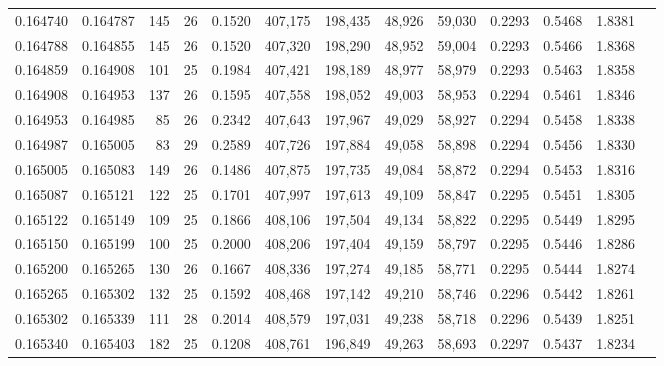 \begin{tabular}{rrrrrrrrrrrrr}
0.164740 & 0.164787 & 145 &  26 &                                     0.1520 & 407,175 & 198,435 &  48,926 &  59,030 & 0.2293 & 0.5468 & 1.8381 \\
0.164788 & 0.164855 & 145 &  26 &                                     0.1520 & 407,320 & 198,290 &  48,952 &  59,004 & 0.2293 & 0.5466 & 1.8368 \\
0.164859 & 0.164908 & 101 &  25 &                                     0.1984 & 407,421 & 198,189 &  48,977 &  58,979 & 0.2293 & 0.5463 & 1.8358 \\
0.164908 & 0.164953 & 137 &  26 &                                     0.1595 & 407,558 & 198,052 &  49,003 &  58,953 & 0.2294 & 0.5461 & 1.8346 \\
0.164953 & 0.164985 &  85 &  26 &                                     0.2342 & 407,643 & 197,967 &  49,029 &  58,927 & 0.2294 & 0.5458 & 1.8338 \\
0.164987 & 0.165005 &  83 &  29 &                                     0.2589 & 407,726 & 197,884 &  49,058 &  58,898 & 0.2294 & 0.5456 & 1.8330 \\
0.165005 & 0.165083 & 149 &  26 &                                     0.1486 & 407,875 & 197,735 &  49,084 &  58,872 & 0.2294 & 0.5453 & 1.8316 \\
0.165087 & 0.165121 & 122 &  25 &                                     0.1701 & 407,997 & 197,613 &  49,109 &  58,847 & 0.2295 & 0.5451 & 1.8305 \\
0.165122 & 0.165149 & 109 &  25 &                                     0.1866 & 408,106 & 197,504 &  49,134 &  58,822 & 0.2295 & 0.5449 & 1.8295 \\
0.165150 & 0.165199 & 100 &  25 &                                     0.2000 & 408,206 & 197,404 &  49,159 &  58,797 & 0.2295 & 0.5446 & 1.8286 \\
0.165200 & 0.165265 & 130 &  26 &                                     0.1667 & 408,336 & 197,274 &  49,185 &  58,771 & 0.2295 & 0.5444 & 1.8274 \\
0.165265 & 0.165302 & 132 &  25 &                                     0.1592 & 408,468 & 197,142 &  49,210 &  58,746 & 0.2296 & 0.5442 & 1.8261 \\
0.165302 & 0.165339 & 111 &  28 &                                     0.2014 & 408,579 & 197,031 &  49,238 &  58,718 & 0.2296 & 0.5439 & 1.8251 \\
0.165340 & 0.165403 & 182 &  25 &                                     0.1208 & 408,761 & 196,849 &  49,263 &  58,693 & 0.2297 & 0.5437 & 1.8234 \\

\end{tabular}
